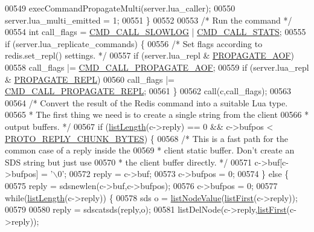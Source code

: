 \begin{DoxyCode}
{{{{{{{00549         execCommandPropagateMulti(server.lua\_caller);
00550         server.lua\_multi\_emitted = 1;
00551     \}
00552 
00553     \textcolor{comment}{/* Run the command */}
00554     \textcolor{keywordtype}{int} call\_flags = \hyperlink{server_8h_a934cea7b13db05a29264146cd5b14064}{CMD\_CALL\_SLOWLOG} | \hyperlink{server_8h_a7b1d9cf5be21e4808da0c16f03155973}{CMD\_CALL\_STATS};
00555     \textcolor{keywordflow}{if} (server.lua\_replicate\_commands) \{
00556         \textcolor{comment}{/* Set flags according to redis.set\_repl() settings. */}
00557         \textcolor{keywordflow}{if} (server.lua\_repl & \hyperlink{server_8h_a542fb79924ca427c866fd63632f60777}{PROPAGATE\_AOF})
00558             call\_flags |= \hyperlink{server_8h_a3ca848c94df18641ac372c58fca0e236}{CMD\_CALL\_PROPAGATE\_AOF};
00559         \textcolor{keywordflow}{if} (server.lua\_repl & \hyperlink{server_8h_a59c6e025b4ed85642a0472fc3e73e298}{PROPAGATE\_REPL})
00560             call\_flags |= \hyperlink{server_8h_a69e4a8fdb26588e1028deb20fd51424a}{CMD\_CALL\_PROPAGATE\_REPL};
00561     \}
00562     call(c,call\_flags);
00563 
00564     \textcolor{comment}{/* Convert the result of the Redis command into a suitable Lua type.}
00565 \textcolor{comment}{     * The first thing we need is to create a single string from the client}
00566 \textcolor{comment}{     * output buffers. */}
00567     \textcolor{keywordflow}{if} (\hyperlink{adlist_8h_afde0ab079f934670e82119b43120e94b}{listLength}(c->reply) == 0 && c->bufpos < 
      \hyperlink{server_8h_ab467e0a40be9097e85445616d9bb32e3}{PROTO\_REPLY\_CHUNK\_BYTES}) \{
00568         \textcolor{comment}{/* This is a fast path for the common case of a reply inside the}
00569 \textcolor{comment}{         * client static buffer. Don't create an SDS string but just use}
00570 \textcolor{comment}{         * the client buffer directly. */}
00571         c->buf[c->bufpos] = \textcolor{stringliteral}{'\(\backslash\)0'};
00572         reply = c->buf;
00573         c->bufpos = 0;
00574     \} \textcolor{keywordflow}{else} \{
00575         reply = sdsnewlen(c->buf,c->bufpos);
00576         c->bufpos = 0;
00577         \textcolor{keywordflow}{while}(\hyperlink{adlist_8h_afde0ab079f934670e82119b43120e94b}{listLength}(c->reply)) \{
00578             sds o = \hyperlink{adlist_8h_af84cae230e7180ebcda1e2736fce9f65}{listNodeValue}(\hyperlink{adlist_8h_aa8dc514bbe217bb2e87c1c77cfa84690}{listFirst}(c->reply));
00579 
00580             reply = sdscatsds(reply,o);
00581             listDelNode(c->reply,\hyperlink{adlist_8h_aa8dc514bbe217bb2e87c1c77cfa84690}{listFirst}(c->reply));
}}}}}}}
\end{DoxyCode}
